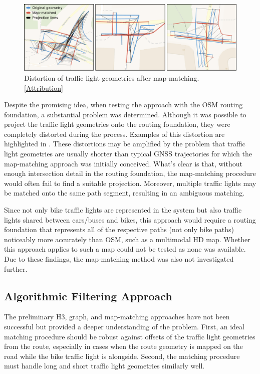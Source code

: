 \begin{figure}[t]
\centering
\includegraphics[width=\linewidth]{images/sg-selection-map-matching-fails.pdf}
\caption{Distortion of traffic light geometries after map-matching. [\hyperref[attribution]{Attribution}]}
\label{fig:sg-selection-map-matching-fails}
\end{figure}

Despite the promising idea, when testing the approach with the OSM routing foundation, a substantial problem was determined. Although it was possible to project the traffic light geometries onto the routing foundation, they were completely distorted during the process. Examples of this distortion are highlighted in . These distortions may be amplified by the problem that traffic light geometries are usually shorter than typical GNSS trajectories for which the map-matching approach was initially conceived. What's clear is that, without enough intersection detail in the routing foundation, the map-matching procedure would often fail to find a suitable projection. Moreover, multiple traffic lights may be matched onto the same path segment, resulting in an ambiguous matching. 

Since not only bike traffic lights are represented in the system but also traffic lights shared between cars/buses and bikes, this approach would require a routing foundation that represents all of the respective paths (not only bike paths) noticeably more accurately than OSM, such as a multimodal HD map. Whether this approach applies to such a map could not be tested as none was available. Due to these findings, the map-matching method was also not investigated further.

\subsection{Algorithmic Filtering Approach}

The preliminary H3, graph, and map-matching approaches have not been successful but provided a deeper understanding of the problem. First, an ideal matching procedure should be robust against offsets of the traffic light geometries from the route, especially in cases when the route geometry is mapped on the road while the bike traffic light is alongside. Second, the matching procedure must handle long and short traffic light geometries similarly well. 

